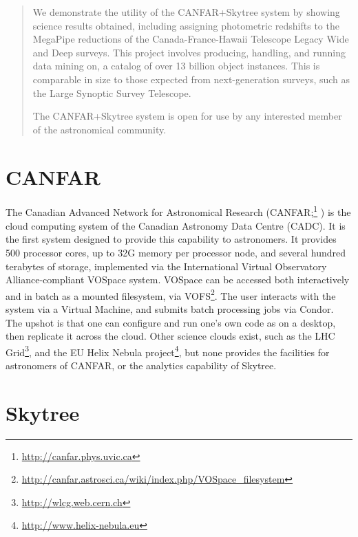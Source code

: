 \begin{abstract}
We demonstrate the utility of the CANFAR+Skytree system by showing science results obtained, including assigning photometric redshifts to the MegaPipe reductions of the Canada-France-Hawaii Telescope Legacy Wide and Deep surveys. This project involves producing, handling, and running data mining on, a catalog of over 13 billion object instances. This is comparable in size to those expected from next-generation surveys, such as the Large Synoptic Survey Telescope.

The CANFAR+Skytree system is open for use by any interested member of the astronomical community.
\end{abstract}

\section{CANFAR} \label{Sec: CANFAR}

The Canadian Advanced Network for Astronomical Research (CANFAR;\footnote{\url{http://canfar.phys.uvic.ca}} \citeauthor{gaudet:canfar} \citeyear{gaudet:canfar}) is the cloud computing system of the Canadian Astronomy Data Centre (CADC). It is the first system designed to provide this capability to astronomers. It provides 500 processor cores, up to 32G memory per processor node, and several hundred terabytes of storage, implemented via the International Virtual Observatory Alliance-compliant VOSpace system. VOSpace can be accessed both interactively and in batch as a mounted filesystem, via VOFS\footnote{\url{http://canfar.astrosci.ca/wiki/index.php/VOSpace_filesystem}}. The user interacts with the system via a Virtual Machine, and submits batch processing jobs via Condor. The upshot is that one can configure and run one's own code as on a desktop, then replicate it across the cloud. Other science clouds exist, such as the LHC Grid\footnote{\url{http://wlcg.web.cern.ch}}, and the EU Helix Nebula project\footnote{\url{http://www.helix-nebula.eu}}, but none provides the facilities for astronomers of CANFAR, or the analytics capability of Skytree.

\section{Skytree} \label{Sec: Skytree}

